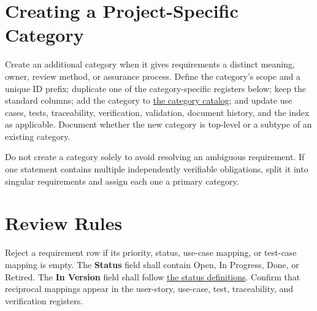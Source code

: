 \section{Creating a Project-Specific Category}
Create an additional category when it gives requirements a distinct meaning,
owner, review method, or assurance process. Define the category's scope and a
unique ID prefix; duplicate one of the category-specific registers below; keep
the standard columns; add the category to
\hyperref[Table:RequirementCategoryCatalog]{the category catalog}; and update
use cases, tests, traceability, verification, validation, document history, and
the index as applicable. Document whether the new category is top-level or a
subtype of an existing category.

Do not create a category solely to avoid resolving an ambiguous requirement.
If one statement contains multiple independently verifiable obligations, split
it into singular requirements and assign each one a primary category.

\section{Review Rules}
Reject a requirement row if its priority, status, use-case mapping, or test-case
mapping is empty. The \textbf{Status} field shall contain Open, In Progress,
Done, or Retired. The \textbf{In Version} field shall follow
\hyperref[Table:RequirementStatusDefinitions]{the status definitions}. Confirm
that reciprocal mappings appear in the user-story, use-case, test,
traceability, and verification registers.

